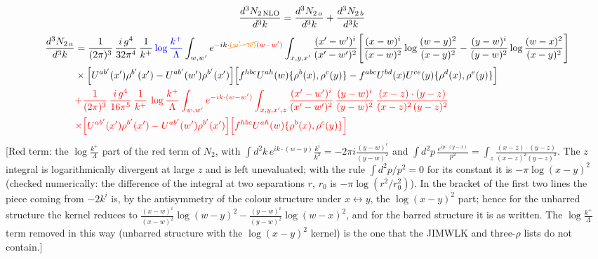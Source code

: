 \documentclass[9pt]{article}
\numberwithin{equation}{section}
\begin{document}
\begin{align}
\frac{d^{3}N_{2\,\rm NLO}}{d^{3}k} &= \frac{d^{3}N_{2\,a}}{d^{3}k} + \frac{d^{3}N_{2\,b}}{d^{3}k}
\end{align}
\begin{align}
\frac{d^{3}N_{2\,a}}{d^{3}k} & = \frac{1}{(2\pi)^{3}}\,\frac{i\,g^{4}}{32\pi^{4}}\,\frac{1}{k^{+}}\,{\color{blue}\log\frac{k^{+}}{\Lambda}}\int_{w,w'} e^{-ik\cdot{\color{orange}\cancel{(w'-w)}}{\color{red}(w-w')}}\int_{x,y,x'}\frac{(x'-w')^{i}}{(x'-w')^{2}}\Bigg[\frac{(x-w)^{i}}{(x-w)^{2}}\log\frac{(w-y)^{2}}{(x-y)^{2}}-\frac{(y-w)^{i}}{(y-w)^{2}}\log\frac{(w-x)^{2}}{(x-y)^{2}}\Bigg]\notag\\
&\times\Big[U^{ab'}(x')\rho^{b'}(x')-U^{ab'}(w')\rho^{b'}(x')\Big]\Big[f^{hbc}U^{ah}(w)\{\rho^{b}(x),\rho^{c}(y)\}-f^{abc}U^{bd}(x)U^{ce}(y)\{\rho^{d}(x),\rho^{e}(y)\}\Big] \notag\\ & {\color{red}+\frac{1}{(2\pi)^{3}}\,\frac{i\,g^{4}}{16\pi^{5}}\,\frac{1}{k^{+}}\,\log\frac{k^{+}}{\Lambda}\int_{w,w^{\prime}} e^{-ik\cdot(w-w^{\prime})}\int_{x,y,x^{\prime},z}\frac{(x^{\prime}-w^{\prime})^{i}}{(x^{\prime}-w^{\prime})^{2}}\,\frac{(y-w)^{i}}{(y-w)^{2}}\,\frac{(x-z)\cdot(y-z)}{(x-z)^{2}\,(y-z)^{2}}} \notag\\ & {\color{red}\times\Big[U^{ab^{\prime}}(x^{\prime})\rho^{b^{\prime}}(x^{\prime})-U^{ab^{\prime}}(w^{\prime})\rho^{b^{\prime}}(x^{\prime})\Big]\Big[f^{hbc}U^{ah}(w)\{\rho^{b}(x),\rho^{c}(y)\}\Big]}
\end{align} {\color{red}[Red term: the $\log\frac{k^{+}}{\Lambda}$ part of the red term of $N_{2}$, with $\int d^{2}k\,e^{ik\cdot(w-y)}\frac{k^{i}}{k^{2}}=-2\pi i\frac{(y-w)^{i}}{(y-w)^{2}}$ and $\int d^{2}p\,\frac{e^{ip\cdot(y-x)}}{p^{2}}=\int_{z}\frac{(x-z)\cdot(y-z)}{(x-z)^{2}(y-z)^{2}}$. The $z$ integral is logarithmically divergent at large $z$ and is left unevaluated; with the rule $\int d^{2}p/p^{2}=0$ for its constant it is $-\pi\log(x-y)^{2}$ (checked numerically: the difference of the integral at two separations $r$, $r_{0}$ is $-\pi\log(r^{2}/r_{0}^{2})$). In the bracket of the first two lines the piece coming from $-2k^{i}$ is, by the antisymmetry of the colour structure under $x\leftrightarrow y$, the $\log(x-y)^{2}$ part; hence for the unbarred structure the kernel reduces to $\frac{(x-w)^{i}}{(x-w)^{2}}\log(w-y)^{2}-\frac{(y-w)^{i}}{(y-w)^{2}}\log(w-x)^{2}$, and for the barred structure it is as written. The $\log\frac{k^{+}}{\Lambda}$ term removed in this way (unbarred structure with the $\log(x-y)^{2}$ kernel) is the one that the JIMWLK and three-$\rho$ lists do not contain.]}\par\noindent
\end{document}
